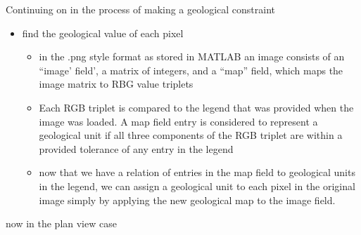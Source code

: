 Continuing on in the process of making a geological constraint
\begin{itemize}
\item find the geological value of each pixel
\begin{itemize}
	\item in the .png style format as stored in MATLAB an image consists of an ``image' field', a matrix of integers, and a ``map'' field, which maps the image matrix to RBG value triplets
	\item Each RGB triplet is compared to the legend that was provided when the image was loaded. A map field entry is considered to represent a geological unit if all three components of the RGB triplet are within a provided tolerance of any entry in the legend
	\item now that we have a relation of entries in the map field to geological units in the legend, we can assign a geological unit to each pixel in the original image simply by applying the new geological map to the image field.
\end{itemize}
\end{itemize}

now in the plan view case

